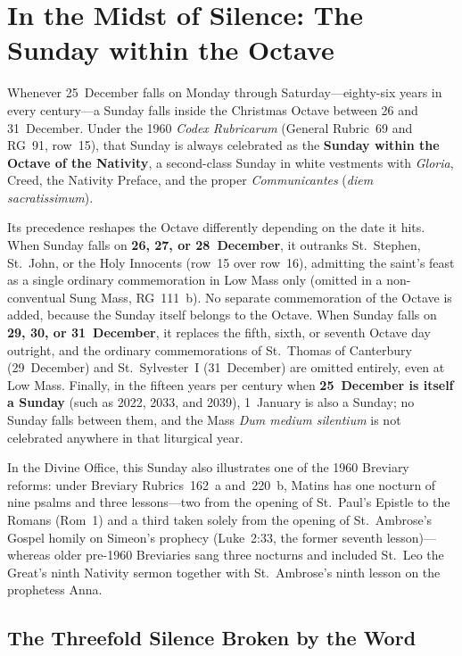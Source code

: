 \section{In the Midst of Silence: The Sunday within the Octave}\label{sec:sunday-octave}

Whenever 25~December falls on Monday through Saturday---eighty-six years in
every century---a Sunday falls inside the Christmas Octave between 26 and
31~December. Under the 1960 \textit{Codex Rubricarum} (General Rubric~69 and
RG~91, row~15), that Sunday is always celebrated as the \textbf{Sunday within
the Octave of the Nativity}, a second-class Sunday in white vestments with
\textit{Gloria}, Creed, the Nativity Preface, and the proper
\textit{Communicantes} (\textit{diem sacratissimum}).

Its precedence reshapes the Octave differently depending on the date it hits.
When Sunday falls on \textbf{26, 27, or 28~December}, it outranks St.~Stephen,
St.~John, or the Holy Innocents (row~15 over row~16), admitting the saint's
feast as a single ordinary commemoration in Low Mass only (omitted in a
non-conventual Sung Mass, RG~111~b). No separate commemoration of the Octave is
added, because the Sunday itself belongs to the Octave. When Sunday falls on
\textbf{29, 30, or 31~December}, it replaces the fifth, sixth, or seventh
Octave day outright, and the ordinary commemorations of St.~Thomas of Canterbury
(29~December) and St.~Sylvester~I (31~December) are omitted entirely, even at
Low Mass. Finally, in the fifteen years per century when \textbf{25~December is
itself a Sunday} (such as 2022, 2033, and 2039), 1~January is also a Sunday; no
Sunday falls between them, and the Mass \textit{Dum medium silentium} is not
celebrated anywhere in that liturgical year.

In the Divine Office, this Sunday also illustrates one of the 1960 Breviary
reforms: under Breviary Rubrics~162~a and~220~b, Matins has one nocturn of nine
psalms and three lessons---two from the opening of St.~Paul's Epistle to the
Romans (Rom~1) and a third taken solely from the opening of St.~Ambrose's Gospel
homily on Simeon's prophecy (Luke~2:33, the former seventh lesson)---whereas
older pre-1960 Breviaries sang three nocturns and included St.~Leo the Great's
ninth Nativity sermon together with St.~Ambrose's ninth lesson on the prophetess
Anna.

\subsection{The Threefold Silence Broken by the Word}

